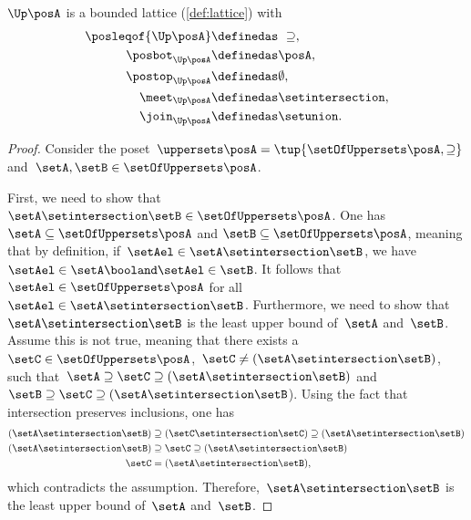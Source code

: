 \begin{lemma}
	\label{lem:u_bounded_lat}
	$\Up \posA$ is a bounded lattice (\cref{def:lattice}) with
	\begin{equation}
		\begin{aligned}
			\posleqof{\Up \posA} & \definedas \ \supseteq,      \\
			\posbot_{\Up \posA}  & \definedas \posA,            \\
			\postop_{\Up \posA}  & \definedas \emptyset,        \\
			\meet_{\Up \posA}    & \definedas \setintersection, \\
			\join_{\Up \posA}    & \definedas \setunion.
		\end{aligned}
	\end{equation}
\end{lemma}
\begin{proof}
	Consider the poset~$\uppersets \posA=\tup{\setOfUppersets \posA,\supseteq}$ and~$\setA,\setB\in \setOfUppersets \posA$.

	First, we need to show that~$\setA\setintersection \setB\in \setOfUppersets \posA$.
	One has~$\setA \subseteq \setOfUppersets \posA$ and $\setB\subseteq \setOfUppersets \posA$, meaning that by definition, if~$\setAel\in \setA\setintersection \setB$, we have~$\setAel \in \setA \booland \setAel \in \setB$.
	It follows that~$\setAel \in \setOfUppersets \posA$ for all~$\setAel \in \setA\setintersection \setB$.
	Furthermore, we need to show that~$\setA\setintersection \setB$ is the least upper bound of~$\setA$ and~$\setB$.
	Assume this is not true, meaning that there exists a~$\setC\in \setOfUppersets \posA$,~$\setC\neq (\setA\setintersection \setB)$, such that~$\setA\supseteq \setC\supseteq (\setA\setintersection \setB)$ and~$\setB\supseteq \setC\supseteq (\setA\setintersection \setB$).
		Using the fact that intersection preserves inclusions, one has
		\begin{equation}
			\begin{aligned}
				(\setA\setintersection \setB)
				                              & \supseteq (\setC\setintersection \setC) \supseteq (\setA\setintersection \setB ) \\
				(\setA\setintersection \setB) & \supseteq \setC \supseteq (\setA\setintersection \setB )                         \\
				\setC                         & = (\setA\setintersection \setB),
			\end{aligned}
		\end{equation}
		which contradicts the assumption.
		Therefore,~$\setA\setintersection \setB$ is the least upper bound of~$\setA$ and~$\setB$.


\end{proof}

